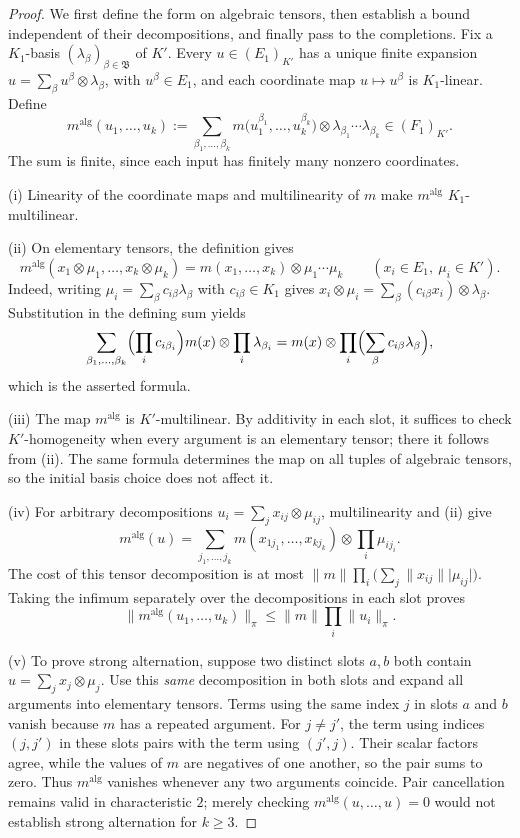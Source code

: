 \documentclass[11pt]{amsart}
\theoremstyle{definition}
\theoremstyle{remark}
\numberwithin{equation}{section}
\newcommand{\abs}[1]{\lvert #1\rvert}
\newcommand{\norm}[1]{\lVert #1\rVert}
\begin{document}
\begin{proof}
We first define the form on algebraic tensors, then establish a bound independent of their decompositions, and
finally pass to the completions. Fix a $K_1$\nobreakdash-basis $(\lambda_\beta)_{\beta\in\mathfrak B}$ of $K'$.
Every $u\in(E_1)_{K'}$ has a unique finite expansion
$u=\sum_\beta u^\beta\otimes\lambda_\beta$, with $u^\beta\in E_1$, and each coordinate map $u\mapsto u^\beta$ is
$K_1$\nobreakdash-linear. Define
\[
m^{\mathrm{alg}}(u_1,\dots,u_k):=
\sum_{\beta_1,\dots,\beta_k}
m\bigl(u_1^{\beta_1},\dots,u_k^{\beta_k}\bigr)\otimes
\lambda_{\beta_1}\cdots\lambda_{\beta_k}\in(F_1)_{K'}.
\]
The sum is finite, since each input has finitely many nonzero coordinates.

\textup{(i)} Linearity of the coordinate maps and multilinearity of $m$ make $m^{\mathrm{alg}}$
$K_1$\nobreakdash-multilinear.

\textup{(ii)} On elementary tensors, the definition gives
\[
m^{\mathrm{alg}}(x_1\otimes\mu_1,\dots,x_k\otimes\mu_k)
=m(x_1,\dots,x_k)\otimes\mu_1\cdots\mu_k
\qquad(x_i\in E_1,\ \mu_i\in K').
\]
Indeed, writing $\mu_i=\sum_\beta c_{i\beta}\lambda_\beta$ with $c_{i\beta}\in K_1$ gives
$x_i\otimes\mu_i=\sum_\beta(c_{i\beta}x_i)\otimes\lambda_\beta$. Substitution in the defining sum yields
\[
\sum_{\beta_1,\dots,\beta_k}
\Bigl(\prod_ic_{i\beta_i}\Bigr)m(x)\otimes\prod_i\lambda_{\beta_i}
=m(x)\otimes\prod_i\Bigl(\sum_\beta c_{i\beta}\lambda_\beta\Bigr),
\]
which is the asserted formula.

\textup{(iii)} The map $m^{\mathrm{alg}}$ is $K'$\nobreakdash-multilinear. By additivity in each slot, it suffices
to check $K'$\nobreakdash-homogeneity when every argument is an elementary tensor; there it follows from
\textup{(ii)}. The same formula determines the map on all tuples of algebraic tensors, so the initial basis
choice does not affect it.

\textup{(iv)} For arbitrary decompositions $u_i=\sum_jx_{ij}\otimes\mu_{ij}$, multilinearity and \textup{(ii)} give
\[
m^{\mathrm{alg}}(u)=
\sum_{j_1,\dots,j_k}m(x_{1j_1},\dots,x_{kj_k})\otimes\prod_i\mu_{ij_i}.
\]
The cost of this tensor decomposition is at most
$\norm m\prod_i\bigl(\sum_j\norm{x_{ij}}\abs{\mu_{ij}}\bigr)$.
Taking the infimum separately over the decompositions in each slot proves
\[
\norm{m^{\mathrm{alg}}(u_1,\dots,u_k)}_\pi\le\norm m\prod_i\norm{u_i}_\pi.
\]

\textup{(v)} To prove strong alternation, suppose two distinct slots $a,b$ both contain
$u=\sum_jx_j\otimes\mu_j$. Use this \emph{same} decomposition in both slots and expand all arguments into
elementary tensors. Terms using the same index $j$ in slots $a$ and $b$ vanish because $m$ has a repeated
argument. For $j\ne j'$, the term using indices $(j,j')$ in these slots pairs with the term using $(j',j)$.
Their scalar factors agree, while the values of $m$ are negatives of one another, so the pair sums to zero.
Thus $m^{\mathrm{alg}}$ vanishes whenever any two arguments coincide. Pair cancellation remains valid in
characteristic $2$; merely checking $m^{\mathrm{alg}}(u,\dots,u)=0$ would not establish strong alternation for
$k\ge3$.


\end{proof}
\end{document}
